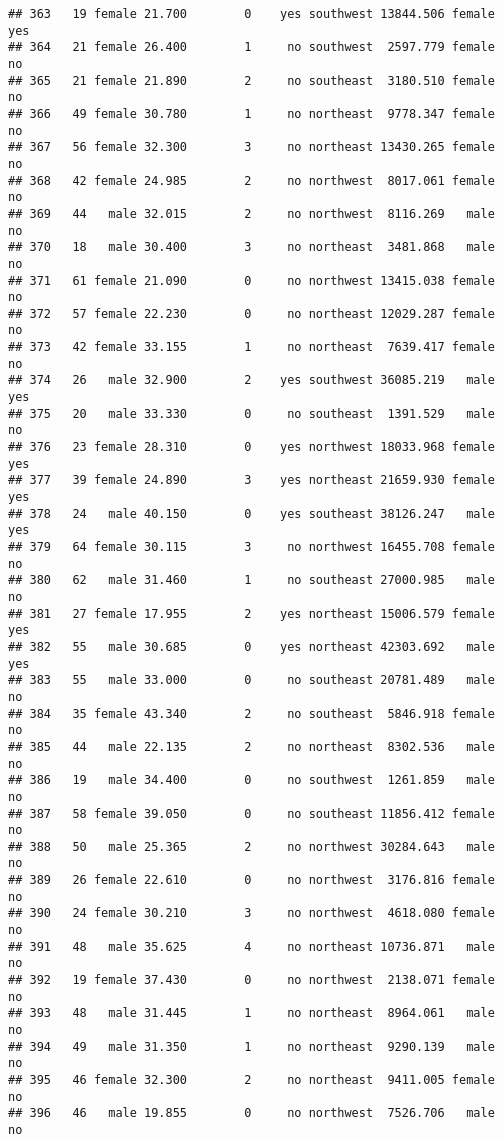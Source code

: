\documentclass[
]{article}
\begin{document}
\begin{verbatim}
## 363   19 female 21.700        0    yes southwest 13844.506 female      yes
## 364   21 female 26.400        1     no southwest  2597.779 female       no
## 365   21 female 21.890        2     no southeast  3180.510 female       no
## 366   49 female 30.780        1     no northeast  9778.347 female       no
## 367   56 female 32.300        3     no northeast 13430.265 female       no
## 368   42 female 24.985        2     no northwest  8017.061 female       no
## 369   44   male 32.015        2     no northwest  8116.269   male       no
## 370   18   male 30.400        3     no northeast  3481.868   male       no
## 371   61 female 21.090        0     no northwest 13415.038 female       no
## 372   57 female 22.230        0     no northeast 12029.287 female       no
## 373   42 female 33.155        1     no northeast  7639.417 female       no
## 374   26   male 32.900        2    yes southwest 36085.219   male      yes
## 375   20   male 33.330        0     no southeast  1391.529   male       no
## 376   23 female 28.310        0    yes northwest 18033.968 female      yes
## 377   39 female 24.890        3    yes northeast 21659.930 female      yes
## 378   24   male 40.150        0    yes southeast 38126.247   male      yes
## 379   64 female 30.115        3     no northwest 16455.708 female       no
## 380   62   male 31.460        1     no southeast 27000.985   male       no
## 381   27 female 17.955        2    yes northeast 15006.579 female      yes
## 382   55   male 30.685        0    yes northeast 42303.692   male      yes
## 383   55   male 33.000        0     no southeast 20781.489   male       no
## 384   35 female 43.340        2     no southeast  5846.918 female       no
## 385   44   male 22.135        2     no northeast  8302.536   male       no
## 386   19   male 34.400        0     no southwest  1261.859   male       no
## 387   58 female 39.050        0     no southeast 11856.412 female       no
## 388   50   male 25.365        2     no northwest 30284.643   male       no
## 389   26 female 22.610        0     no northwest  3176.816 female       no
## 390   24 female 30.210        3     no northwest  4618.080 female       no
## 391   48   male 35.625        4     no northeast 10736.871   male       no
## 392   19 female 37.430        0     no northwest  2138.071 female       no
## 393   48   male 31.445        1     no northeast  8964.061   male       no
## 394   49   male 31.350        1     no northeast  9290.139   male       no
## 395   46 female 32.300        2     no northeast  9411.005 female       no
## 396   46   male 19.855        0     no northwest  7526.706   male       no

\end{verbatim}
\end{document}
